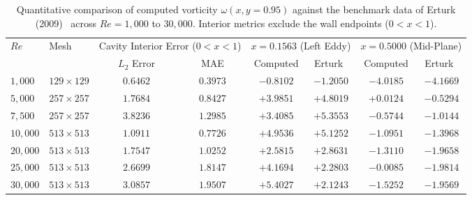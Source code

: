 \documentclass[11pt,a4paper]{article}
\begin{document}
\begin{table}[htbp]
\centering
\footnotesize
\caption{Quantitative comparison of computed vorticity $\omega(x, y=0.95)$ against the benchmark data of Erturk (2009)~\cite{erturk2009benchmarks} across $Re = 1,000$ to $30,000$. Interior metrics exclude the wall endpoints ($0 < x < 1$).}
\label{tab:erturk_vorticity_benchmark}
\begin{tabular*}{\textwidth}{@{\extracolsep{\fill}}llcccccc@{}}
\toprule
$Re$ & Mesh & \multicolumn{2}{c}{Cavity Interior Error ($0 < x < 1$)} & \multicolumn{2}{c}{$x = 0.1563$ (Left Eddy)} & \multicolumn{2}{c}{$x = 0.5000$ (Mid-Plane)} \\
\cmidrule(lr){3-4} \cmidrule(lr){5-6} \cmidrule(lr){7-8}
 & & $L_2$ Error & MAE & Computed & Erturk~\cite{erturk2009benchmarks} & Computed & Erturk~\cite{erturk2009benchmarks} \\
\midrule
$1,000$  & $129 \times 129$ & $\mathbf{0.6462}$ & $\mathbf{0.3973}$ & $-0.8102$ & $-1.2050$ & $-4.0185$ & $-4.1669$ \\
$5,000$  & $257 \times 257$ & $\mathbf{1.7684}$ & $\mathbf{0.8427}$ & $+3.9851$ & $+4.8019$ & $+0.0124$ & $-0.5294$ \\
$7,500$  & $257 \times 257$ & $\mathbf{3.8236}$ & $\mathbf{1.2985}$ & $+3.4085$ & $+5.3553$ & $-0.5744$ & $-1.0144$ \\
$10,000$ & $513 \times 513$ & $\mathbf{1.0911}$ & $\mathbf{0.7726}$ & $+4.9536$ & $+5.1252$ & $-1.0951$ & $-1.3968$ \\
$20,000$ & $513 \times 513$ & $\mathbf{1.7547}$ & $\mathbf{1.0252}$ & $+2.5815$ & $+2.8631$ & $-1.3110$ & $-1.9658$ \\
$25,000$ & $513 \times 513$ & $\mathbf{2.6699}$ & $\mathbf{1.8147}$ & $+4.1694$ & $+2.2803$ & $-0.0085$ & $-1.9814$ \\
$30,000$ & $513 \times 513$ & $\mathbf{3.0857}$ & $\mathbf{1.9507}$ & $+5.4027$ & $+2.1243$ & $-1.5252$ & $-1.9569$ \\
\bottomrule
\end{tabular*}
\end{table}
\end{document}
